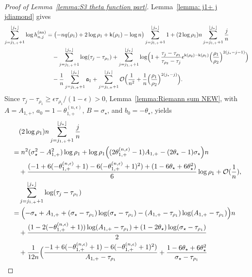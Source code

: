 \documentclass[a4paper]{article}
\numberwithin{equation}{section}
\begin{document}
\begin{proof}[Proof of Lemma~\ref{lemma:S3 theta function part}]
Lemma~\ref{lemma: j1+ j jdiamond} gives
\begin{align*}
\sum_{j=j_{1,+}+1}^{\lfloor j_{\star} \rfloor}\log h_{n,j}^{(\mathrm{an})} &=
\bigl(-nq(\rho_1)+2\log \rho_1+\mathsf{k}(\rho_1)-\log n\bigr)\sum_{j=j_{1,+}+1}^{\lfloor j_{\star}\rfloor}1
+
(2\log\rho_1)n \sum_{j=j_{1,+}+1}^{\lfloor j_{\star}\rfloor}\frac{j}{n}
\\
&\quad-\sum_{j=j_{1,+}+1}^{\lfloor j_{\star}\rfloor}\log(\tau_j-\tau_{\rho_1})
+\sum_{j=j_{1,+}+1}^{\lfloor j_{\star}\rfloor}\log\Bigl(1+\frac{\tau_j-\tau_{\rho_1}}{\tau_{\rho_2}-\tau_j}e^{\mathsf{k}(\rho_2)-\mathsf{k}(\rho_1)}\Bigl(\frac{\rho_1}{\rho_2} \Bigr)^{2(j_{\star}-j-1)}\Bigr)
\\
&\quad
-\frac{1}{n}\sum_{j=j_{1,+}+1}^{\lfloor j_{\star}\rfloor}\mathfrak{a}_{1}+\sum_{j=j_{1,+}+1}^{\lfloor j_{\star}\rfloor}\mathcal{O}\Bigl(\frac{1}{n^2}+\frac{1}{n}\Bigl(\frac{\rho_1}{\rho_2}\Bigr)^{2(j_{\star}-j)}\Bigr).
\end{align*}
Since $\tau_j-\tau_{\rho_1}\geq\epsilon\tau_{\rho_1}/(1-\epsilon)>0$, Lemma~\ref{lemma:Riemann sum NEW}, with $A=A_{1,+}$, $a_0=1-\theta_{1,+}^{(n,\epsilon)}$, $B=\sigma_\star$, and $b_0=-\theta_\star$, yields
\begin{align*}
&\quad (2\log\rho_1)n\sum_{j=j_{1,+}+1}^{\lfloor j_{\star}\rfloor}\frac{j}{n}
\\
&=n^2(\sigma_{\star}^2-A_{1,+}^2)\log\rho_1+\log\rho_1\Bigl((2\theta_{1,+}^{(n,\epsilon)}-1)A_{1,+}-(2\theta_{\star}-1)\sigma_{\star}\Bigr) n
\\
&\quad+\frac{(-1+6(-\theta_{1,+}^{(n,\epsilon)}+1)-6(-\theta_{1,+}^{(n,\epsilon)}+1)^2)+(1-6\theta_{\star}+6\theta_{\star}^2)}{6}\log\rho_1+\mathcal{O}(\frac{1}{n}),
\\
&\quad \sum_{j=j_{1,+}+1}^{\lfloor j_{\star}\rfloor}\log(\tau_j-\tau_{\rho_1})
\\
&=
\Bigl( 
-\sigma_{\star}+A_{1,+}+(\sigma_{\star}-\tau_{\rho_1})\log (\sigma_{\star}-\tau_{\rho_1})-(A_{1,+}-\tau_{\rho_1})\log (A_{1,+}-\tau_{\rho_1})
\Bigr)n
\\
&\quad +\frac{(1-2(-\theta_{1,+}^{(n,\epsilon)}+1))\log(A_{1,+}-\tau_{\rho_1})+(1-2\theta_{\star})\log(\sigma_{\star}-\tau_{\rho_1})}{2}
\\
&\quad +\frac{1}{12n}\Bigl(
\frac{-1+6(-\theta_{1,+}^{(n,\epsilon)}+1)-6(-\theta_{1,+}^{(n,\epsilon)}+1)^2)}{A_{1,+}-\tau_{\rho_1}}
+
\frac{1-6\theta_{\star}+6\theta_{\star}^2}{\sigma_{\star}-\tau_{\rho_1}}

\end{align*}
\end{proof}
\end{document}
